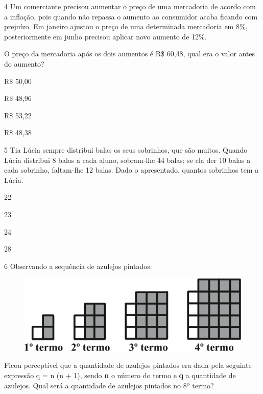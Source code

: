 \num{4} Um comerciante precisou aumentar o preço de uma mercadoria de acordo com a inflação, pois quando não repassa o aumento ao consumidor acaba ficando com prejuízo. Em janeiro ajustou o preço de uma determinada mercadoria em 8\%, posteriormente em junho precisou aplicar novo aumento de 12\%.

\pagebreak
O preço da mercadoria após os dois aumentos é R\$ 60,48, qual era o
valor antes do aumento?

\begin{escolha}

\item
  R\$ 50,00
\item
  R\$ 48,96
\item
  R\$ 53,22
\item
  R\$ 48,38
\end{escolha}


\num{5} Tia Lúcia sempre distribui balas os seus sobrinhos, que são muitos. Quando Lúcia distribui 8 balas a cada aluno, sobram-lhe 44 balas; se ela der 10 balas a cada sobrinho, faltam-lhe 12 balas. Dado o apresentado, quantos sobrinhos tem a Lúcia.

\begin{escolha}
\item 22

\item 23

\item 24

\item 28
\end{escolha}

\num{6} Observando a sequência de azulejos pintados:

\begin{figure}[htpb!]
\centering
\includegraphics[width=\textwidth]{./ilustras-mat/Simulado_4-_atividade_6.png}
\end{figure}

Ficou perceptível que a quantidade de azulejos pintados era dada pela
seguinte expressão q = n \cdot (n + 1), sendo \textbf{n} o número do termo e
\textbf{q} a quantidade de azulejos. Qual será a quantidade de azulejos
pintados no 8º termo?

